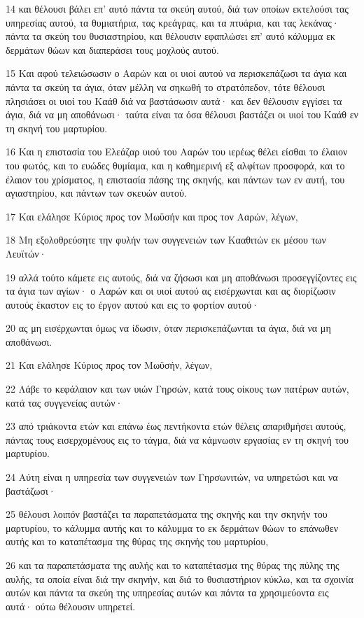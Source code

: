\par 14 και θέλουσι βάλει επ' αυτό πάντα τα σκεύη αυτού, διά των οποίων εκτελούσι τας υπηρεσίας αυτού, τα θυμιατήρια, τας κρεάγρας, και τα πτυάρια, και τας λεκάνας· πάντα τα σκεύη του θυσιαστηρίου, και θέλουσιν εφαπλώσει επ' αυτό κάλυμμα εκ δερμάτων θώων και διαπεράσει τους μοχλούς αυτού.
\par 15 Και αφού τελειώσωσιν ο Ααρών και οι υιοί αυτού να περισκεπάζωσι τα άγια και πάντα τα σκεύη τα άγια, όταν μέλλη να σηκωθή το στρατόπεδον, τότε θέλουσι πλησιάσει οι υιοί του Καάθ διά να βαστάσωσιν αυτά· και δεν θέλουσιν εγγίσει τα άγια, διά να μη αποθάνωσι· ταύτα είναι τα όσα θέλουσι βαστάζει οι υιοί του Καάθ εν τη σκηνή του μαρτυρίου.
\par 16 Και η επιστασία του Ελεάζαρ υιού του Ααρών του ιερέως θέλει είσθαι το έλαιον του φωτός, και το ευώδες θυμίαμα, και η καθημερινή εξ αλφίτων προσφορά, και το έλαιον του χρίσματος, η επιστασία πάσης της σκηνής, και πάντων των εν αυτή, του αγιαστηρίου, και πάντων των σκευών αυτού.
\par 17 Και ελάλησε Κύριος προς τον Μωϋσήν και προς τον Ααρών, λέγων,
\par 18 Μη εξολοθρεύσητε την φυλήν των συγγενειών των Κααθιτών εκ μέσου των Λευϊτών·
\par 19 αλλά τούτο κάμετε εις αυτούς, διά να ζήσωσι και μη αποθάνωσι προσεγγίζοντες εις τα άγια των αγίων· ο Ααρών και οι υιοί αυτού ας εισέρχωνται και ας διορίζωσιν αυτούς έκαστον εις το έργον αυτού και εις το φορτίον αυτού·
\par 20 ας μη εισέρχωνται όμως να ίδωσιν, όταν περισκεπάζωνται τα άγια, διά να μη αποθάνωσι.
\par 21 Και ελάλησε Κύριος προς τον Μωϋσήν, λέγων,
\par 22 Λάβε το κεφάλαιον και των υιών Γηρσών, κατά τους οίκους των πατέρων αυτών, κατά τας συγγενείας αυτών·
\par 23 από τριάκοντα ετών και επάνω έως πεντήκοντα ετών θέλεις απαριθμήσει αυτούς, πάντας τους εισερχομένους εις το τάγμα, διά να κάμνωσιν εργασίας εν τη σκηνή του μαρτυρίου.
\par 24 Αύτη είναι η υπηρεσία των συγγενειών των Γηρσωνιτών, να υπηρετώσι και να βαστάζωσι·
\par 25 θέλουσι λοιπόν βαστάζει τα παραπετάσματα της σκηνής και την σκηνήν του μαρτυρίου, το κάλυμμα αυτής και το κάλυμμα το εκ δερμάτων θώων το επάνωθεν αυτής και το καταπέτασμα της θύρας της σκηνής του μαρτυρίου,
\par 26 και τα παραπετάσματα της αυλής και το καταπέτασμα της θύρας της πύλης της αυλής, τα οποία είναι διά την σκηνήν, και διά το θυσιαστήριον κύκλω, και τα σχοινία αυτών και πάντα τα σκεύη της υπηρεσίας αυτών και πάντα τα χρησιμεύοντα εις αυτά· ούτω θέλουσιν υπηρετεί.

